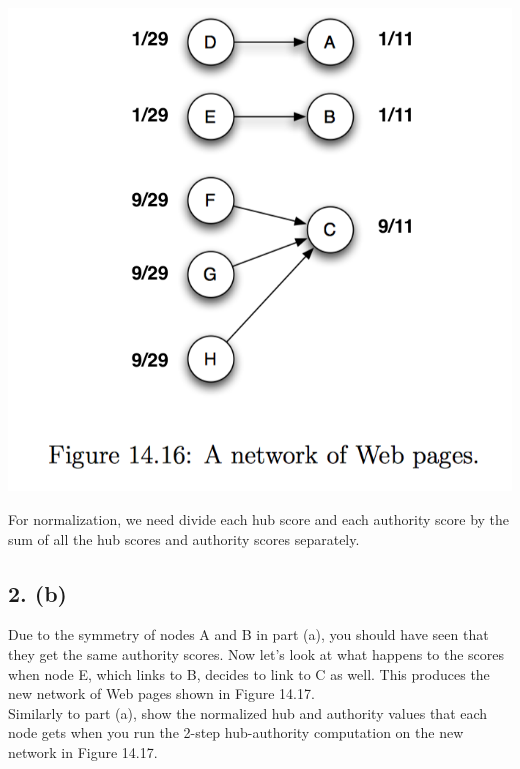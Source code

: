 \documentclass[a4paper]{article}
\begin{document}
\begin{center}
  \includegraphics[scale=0.5]{fig1-after.png}
\end{center}

For normalization, we need divide each hub score and each authority score by the sum of all the hub scores and authority scores separately.

\subsection{2. (b)}

Due to the symmetry of nodes A and B in part (a), you should have seen that they get the same authority scores. Now let’s look at what happens to the scores when node E, which links to B, decides to link to C as well. This produces the new network of Web pages shown in Figure 14.17.\\
Similarly to part (a), show the normalized hub and authority values that each node gets when you run the 2-step hub-authority computation on the new network in Figure 14.17.
\end{document}
